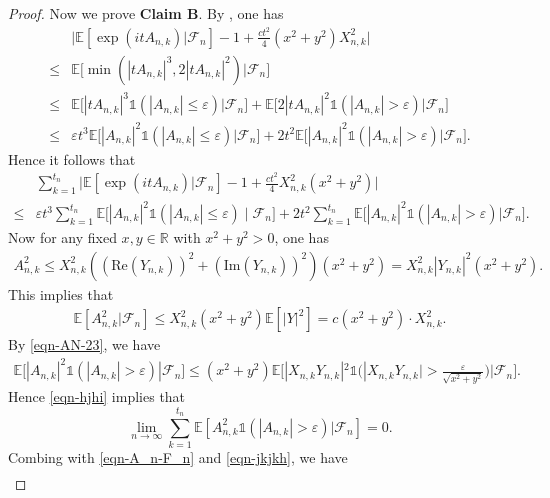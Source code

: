 \documentclass[12pt]{amsart}
\theoremstyle{definition}
\theoremstyle{remark}
\numberwithin{equation}{section}
\begin{document}
\begin{proof}
Now we prove \textbf{Claim B}. By \cite[Lemma 3.3.19]{Rick-Durrett}, one has
\begin{align*}
&\Big|\mathbb{E}[\exp(itA_{n,k})|  \mathcal{F}_n]-1+\frac{ct^2}{4}(x^2+y^2)X_{n,k}^2\Big|
\\
\leq& \mathbb{E}\Big[ \min\left(|tA_{n,k}|^{3},2|tA_{n,k}|^2\right) \big|\mathcal{F}_n\Big]\\
\leq &\mathbb{E}\Big[ |tA_{n,k}|^{3}\mathds{1}(|A_{n,k}|\leq\varepsilon)\big|\mathcal{F}_n\Big]+\mathbb{E}\Big[ 2|tA_{n,k}|^{2}\mathds{1}(|A_{n,k}|>\varepsilon)\big|\mathcal{F}_n\Big]\\
\leq&\varepsilon t^3\mathbb{E}\Big[ |A_{n,k}|^{2}\mathds{1}(|A_{n,k}|\leq\varepsilon)\big|\mathcal{F}_n\Big]+2t^2\mathbb{E}\Big[ |A_{n,k}|^{2}\mathds{1}(|A_{n,k}|>\varepsilon)\big|\mathcal{F}_n\Big].
\end{align*}
Hence it follows that 
\begin{align}\label{eqn-jkjkh}
&\sum_{k=1}^{t_n}\big|\mathbb{E} [\exp(itA_{n,k})|\mathcal{F}_n]-1+\frac{ct^2}{4} X_{n,k}^2 (x^2+y^2)\big|\\\nonumber
\leq &\varepsilon t^3\sum_{k=1}^{t_n}\mathbb{E}\Big[ |A_{n,k}|^{2}\mathds{1}(|A_{n,k}|\leq\varepsilon)\mid\mathcal{F}_n\Big]+2t^2\sum_{k=1}^{t_n}\mathbb{E}\Big[ |A_{n,k}|^{2}\mathds{1}(|A_{n,k}|>\varepsilon)\big|\mathcal{F}_n\Big].
\end{align}
Now for any fixed $x,y\in\mathbb{R}$ with $x^2+y^2>0$, one has
\begin{align}\label{eqn-AN-23}
A_{n,k}^2
\leq X_{n,k}^2((\mathrm{Re}(Y_{n,k}))^2+(\mathrm{Im}(Y_{n,k}))^2)(x^2+y^2)
=X_{n,k}^2|Y_{n,k}|^2(x^2+y^2).
\end{align}
This implies that 
\begin{align}\label{eqn-A_n-F_n}
\mathbb{E}[A_{n,k}^2 | \mathcal{F}_n]\leq X_{n,k}^2(x^2+y^2)\mathbb{E}[|Y|^2]=c(x^2+y^2)\cdot X_{n,k}^2.
\end{align}
By \eqref{eqn-AN-23}, we have
\begin{align*}
\mathbb{E}[ |A_{n,k}|^{2}\mathds{1}(|A_{n,k}|>\varepsilon)|\mathcal{F}_n]
\leq (x^2+y^2)\mathbb{E}\Big[|X_{n,k} Y_{n,k}|^2\mathds{1}\Big(|X_{n,k}Y_{n,k}|>\frac{\varepsilon}{\sqrt{x^2+y^2}}\Big) \Big| \mathcal{F}_n\Big].
\end{align*}
Hence \eqref{eqn-hjhi} implies that 
\[
\lim_{n\rightarrow\infty} \sum_{k=1}^{t_n} \mathbb{E}\left[A_{n,k}^2\mathds{1}(|A_{n,k}|>\varepsilon) | \mathcal{F}_n\right]=0.
\]
Combing with \eqref{eqn-A_n-F_n} and \eqref{eqn-jkjkh}, we have
\begin{align*}

\end{align*}
\end{proof}
\end{document}
